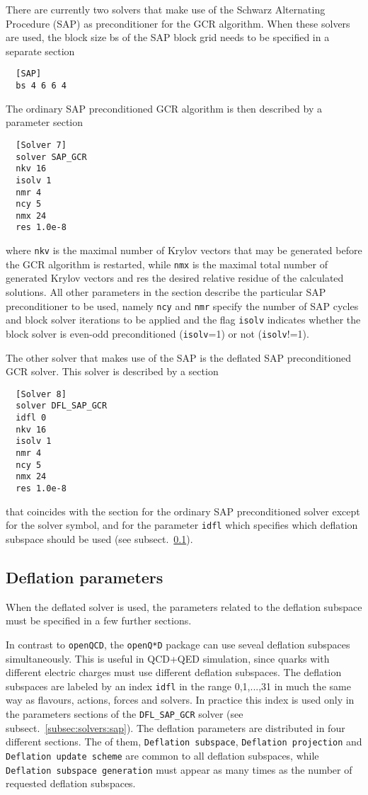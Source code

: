 \documentclass[11pt,fleqn]{article}
\begin{document}
There are currently two solvers that make use of the Schwarz Alternating
Procedure (SAP) as preconditioner for the GCR algorithm. When these solvers are
used, the block size bs of the SAP block grid needs to be specified in a
separate section
%
\begin{verbatim}
  [SAP]
  bs 4 6 6 4
\end{verbatim}
%
The ordinary SAP preconditioned GCR algorithm is then described by a parameter
section
%
\begin{verbatim}
  [Solver 7]
  solver SAP_GCR
  nkv 16
  isolv 1
  nmr 4
  ncy 5
  nmx 24
  res 1.0e-8
\end{verbatim}
%
where \texttt{nkv} is the maximal number of Krylov vectors that may be generated
before the GCR algorithm is restarted, while \texttt{nmx} is the maximal total
number of generated Krylov vectors and res the desired relative residue of the
calculated solutions. All other parameters in the section describe the
particular SAP preconditioner to be used, namely \texttt{ncy} and \texttt{nmr}
specify the number of SAP cycles and block solver iterations to be applied and
the flag \texttt{isolv} indicates whether the block solver is even-odd
preconditioned (\texttt{isolv}=1) or not (\texttt{isolv}!=1).

The other solver that makes use of the SAP is the deflated SAP preconditioned
GCR solver. This solver is described by a section
%
\begin{verbatim}
  [Solver 8]
  solver DFL_SAP_GCR
  idfl 0
  nkv 16
  isolv 1
  nmr 4
  ncy 5
  nmx 24
  res 1.0e-8
\end{verbatim}
%
that coincides with the section for the ordinary SAP preconditioned solver
except for the solver symbol, and for the parameter \texttt{idfl} which
specifies which deflation subspace should be used (see
subsect.~\ref{subsec:solvers:dfl}).


\subsection{Deflation parameters}
\label{subsec:solvers:dfl}

When the deflated solver is used, the parameters related to the deflation
subspace must be specified in a few further sections.

In contrast to \texttt{openQCD}, the \texttt{openQ*D} package can use seveal
deflation subspaces simultaneously. This is useful in QCD+QED simulation, since
quarks with different electric charges must use different deflation subspaces.
The deflation subspaces are labeled by an index \texttt{idfl} in the range
0,1,...,31 in much the same way as flavours, actions, forces and solvers. In
practice this index is used only in the parameters sections of the
\texttt{DFL\_SAP\_GCR} solver (see subsect.~\ref{subsec:solvers:sap}). The
deflation parameters are distributed in four different sections. The of them,
\texttt{Deflation subspace}, \texttt{Deflation projection} and \texttt{Deflation
update scheme} are common to all deflation subspaces, while \texttt{Deflation
subspace generation} must appear as many times as the number of requested
deflation subspaces.
\end{document}
